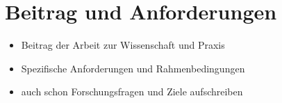 \section{Beitrag und Anforderungen}
\label{ch_02Beitrag und Anforderungen}

\begin{itemize}
	\item Beitrag der Arbeit zur Wissenschaft und Praxis 
	\item Spezifische Anforderungen und Rahmenbedingungen 
	\item auch schon Forschungsfragen und Ziele aufschreiben 
\end{itemize}